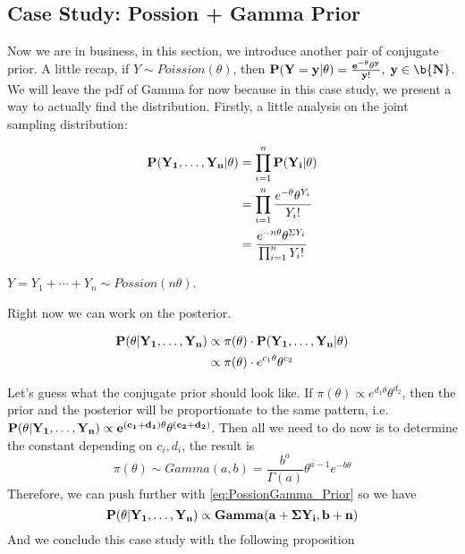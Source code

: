 \subsection{Case Study: Possion + Gamma Prior}
Now we are in business, in this section, we introduce another pair of conjugate prior. A little recap, if $Y \sim Poission(\theta)$, then $\bf{P}(Y=y | \theta) = \frac{e^{-\theta}\theta^y}{y!}, \; y \in \b{N}$. We will leave the pdf of Gamma for now because in this case study, we present a way to actually find the distribution. Firstly, a little analysis on the joint sampling distribution:

\begin{align*}
    \bf{P}(Y_1, \ldots, Y_n | \theta)  &= \prod_{i=1}^{n}\bf{P}(Y_i | \theta) \\
    &= \prod_{i=1}^{n}\frac{e^{-\theta}\theta^{Y_i}}{Y_i!} \\
    &= \frac{e^{-n\theta}\theta^{\Sigma Y_i}}{\prod_{i=1}^{n} Y_i!}
\end{align*}

\begin{note}
    $Y = Y_1 + \cdots + Y_n \sim Possion(n\theta)$.
\end{note}

Right now we can work on the posterior.

\begin{align}
    \bf{P}(\theta | Y_1, \ldots, Y_n) &\propto \pi(\theta) \cdot \bf{P}(Y_1, \ldots, Y_n | \theta) \\
    &\propto \pi(\theta) \cdot e^{c_1\theta}\theta^{c_2} \label{eq:PossionGamma_Prior}
\end{align}

Let's guess what the conjugate prior should look like. If $\pi(\theta) \propto e^{d_1\theta}\theta^{d_2}$, then the prior and the posterior will be proportionate to the same pattern, i.e. $\bf{P}(\theta | Y_1, \ldots, Y_n) \propto e^{(c_1 + d_1)\theta}\theta^{(c_2 + d_2)}$. Then all we need to do now is to determine the constant depending on $c_i, d_i$, the result is
\begin{equation*}
    \pi(\theta) \sim Gamma(a,b) = \frac{b^a}{\Gamma(a)}\theta^{a-1}e^{-b\theta}
\end{equation*}
Therefore, we can push further with \ref{eq:PossionGamma_Prior} so we have
\begin{equation*}
    \bf{P}(\theta | Y_1, \ldots, Y_n) \propto Gamma(a + \Sigma Y_i, b+n)
\end{equation*}
And we conclude this case study with the following proposition

